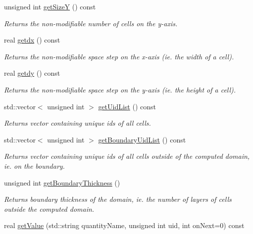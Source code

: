 \begin{DoxyCompactItemize}
unsigned int \hyperlink{classDomain_a66692b4f23353c9b1fe884e583770cb3}{get\+SizeY} () const
\begin{DoxyCompactList}\small\item\em Returns the non-\/modifiable number of cells on the y-\/axis. \end{DoxyCompactList}\item 
real \hyperlink{classDomain_acdb586f6ef994a1621680ec9b946aeb4}{getdx} () const
\begin{DoxyCompactList}\small\item\em Returns the non-\/modifiable space step on the x-\/axis (ie. the width of a cell). \end{DoxyCompactList}\item 
real \hyperlink{classDomain_a5e62ab8a8b53f67cc3c30b6066b10aac}{getdy} () const
\begin{DoxyCompactList}\small\item\em Returns the non-\/modifiable space step on the y-\/axis (ie. the height of a cell). \end{DoxyCompactList}\item 
\mbox{\label{classDomain_accc1ec9b45f0430fa4bb8c7d3eb8d9f4}} 
std\+::vector$<$ unsigned int $>$ \hyperlink{classDomain_accc1ec9b45f0430fa4bb8c7d3eb8d9f4}{get\+Uid\+List} () const
\begin{DoxyCompactList}\small\item\em Returns vector containing unique ids of all cells. \end{DoxyCompactList}\item 
std\+::vector$<$ unsigned int $>$ \hyperlink{classDomain_af3b780bfe072c70ac437f0f31f10d5c4}{get\+Boundary\+Uid\+List} () const
\begin{DoxyCompactList}\small\item\em Returns vector containing unique ids of all cells outside of the computed domain, ie. on the boundary. \end{DoxyCompactList}\item 
unsigned int \hyperlink{classDomain_aa0d225e23c6a454058a3df5b7b5973fa}{get\+Boundary\+Thickness} ()
\begin{DoxyCompactList}\small\item\em Returns boundary thickness of the domain, ie. the number of layers of cells outside the computed domain. \end{DoxyCompactList}\item 
real \hyperlink{classDomain_ad99f85d4d30525bac3ac258a0032bdf7}{get\+Value} (std\+::string quantity\+Name, unsigned int uid, int on\+Next=0) const

\end{DoxyCompactItemize}
